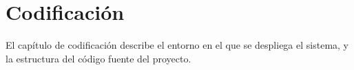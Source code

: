 

\chapter{Codificación}
\thispagestyle{chapterpage}

El capítulo de codificación describe el entorno en el que se 
despliega el sistema, y la estructura del código fuente 
del proyecto.



